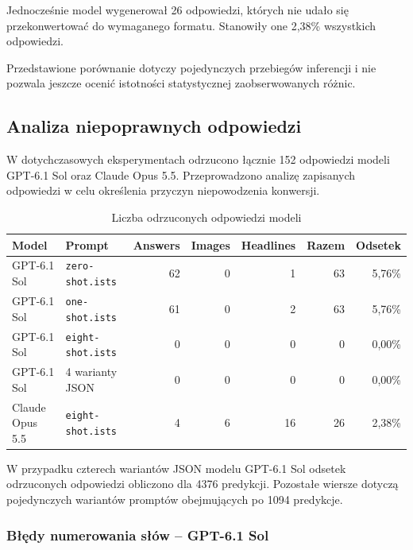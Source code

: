\documentclass[a4paper,10pt]{article}
\begin{document}
Jednocześnie model wygenerował 26 odpowiedzi, których
nie udało się przekonwertować do wymaganego formatu.
Stanowiły one 2,38\% wszystkich odpowiedzi.

Przedstawione porównanie dotyczy pojedynczych
przebiegów inferencji i nie pozwala jeszcze ocenić
istotności statystycznej zaobserwowanych różnic.


\subsection{Analiza niepoprawnych odpowiedzi}

W dotychczasowych eksperymentach odrzucono łącznie
152 odpowiedzi modeli GPT-6.1 Sol oraz Claude Opus 5.5.
Przeprowadzono analizę zapisanych odpowiedzi w celu
określenia przyczyn niepowodzenia konwersji.

\begin{table}[htbp]
    \centering
    \small
    \caption{Liczba odrzuconych odpowiedzi modeli}
    \label{tab:rejected_responses}
    \begin{tabular}{llrrrrr}
        \toprule
        Model & Prompt
        & Answers
        & Images
        & Headlines
        & Razem
        & Odsetek \\
        \midrule
        GPT-6.1 Sol
            & \texttt{zero-shot.ists}
            & 62 & 0 & 1 & 63 & 5,76\% \\
        GPT-6.1 Sol
            & \texttt{one-shot.ists}
            & 61 & 0 & 2 & 63 & 5,76\% \\
        GPT-6.1 Sol
            & \texttt{eight-shot.ists}
            & 0 & 0 & 0 & 0 & 0,00\% \\
        GPT-6.1 Sol
            & 4 warianty JSON
            & 0 & 0 & 0 & 0 & 0,00\% \\
        Claude Opus 5.5
            & \texttt{eight-shot.ists}
            & 4 & 6 & 16 & 26 & 2,38\% \\
        \bottomrule
    \end{tabular}
\end{table}

W przypadku czterech wariantów JSON modelu GPT-6.1 Sol
odsetek odrzuconych odpowiedzi obliczono dla 4376
predykcji. Pozostałe wiersze dotyczą pojedynczych
wariantów promptów obejmujących po 1094 predykcje.


\subsubsection{Błędy numerowania słów -- GPT-6.1 Sol}
\end{document}
